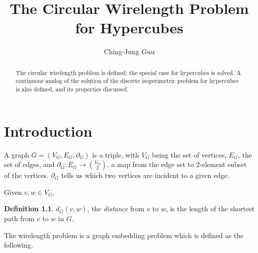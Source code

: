 \documentclass[12pt]{ucthesis}
\title{The Circular Wirelength Problem for Hypercubes}
\author{Ching-Jung Guu}
\theoremstyle{plain}
\theoremstyle{definition}
\newtheorem{definition}{Definition}
\begin{document}
\maketitle
\approvalpage
\copyrightpage

\begin{frontmatter}
\begin{abstract}
The circular wirelength problem is defined;
the special case for hypercubes is solved.
A continuous analog of the solution of the discrete isoperimetric problem
for hypercubes is also defined, and its properties discussed.
\end{abstract}

\tableofcontents

\end{frontmatter}

\chapter{Introduction}
\label{Chapter 1}

A graph $G = (V_G, E_G, \partial_G)$ is a triple,
with $V_G$ being the set of vertices, $E_G$, the set of edges,
and $\partial_G \colon E_G \rightarrow \binom{V_G}{2}$,
a map from the edge set to 2-element subset of the vertices.
$\partial_G$ tells us which two vertices are incident to a given edge.

Given $v, w \in V_G$,
\begin{definition}
\label{Definition 1}
$d_G(v, w)$, the \emph{distance} from $v$ to $w$,
is the length of the shortest path from $v$ to $w$ in $G$.
\end{definition}

The wirelength problem is a graph embedding problem which is defined as the following.
\end{document}
